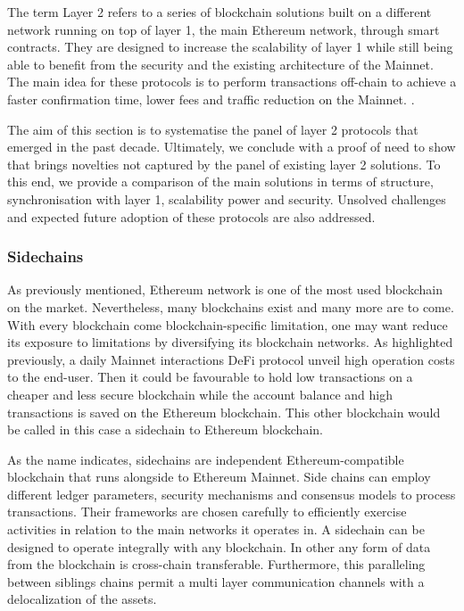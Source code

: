 The term Layer 2 refers to a series of blockchain solutions built on a different network running on top of layer 1, the main Ethereum network, through smart contracts. They are designed to increase the scalability of layer 1 while still being able to benefit from the security and the existing architecture of the Mainnet. The main idea for these protocols is to perform transactions off-chain to achieve a faster confirmation time, lower fees and traffic reduction on the Mainnet. \cite{gudgeon_sok_2020, noauthor_layer_nodate}.

The aim of this section is to systematise the panel of layer 2 protocols that emerged in the past decade. Ultimately, we conclude with a proof of need to show that {\projectName} brings novelties not captured by the panel of existing layer 2 solutions. To this end, we provide a comparison of the main solutions in terms of structure, synchronisation with layer 1, scalability power and security. Unsolved challenges and expected future adoption of these protocols are also addressed.  


\subsubsection{Sidechains}

As previously mentioned, Ethereum network is one of the most used blockchain on the market. Nevertheless, many blockchains exist and many more are to come. With every blockchain come blockchain-specific limitation, one may want reduce its exposure to limitations by diversifying its blockchain networks. As highlighted previously, a daily Mainnet interactions DeFi protocol unveil high operation costs to the end-user. Then it could be favourable to hold low transactions on a cheaper and less secure blockchain while the account balance and high transactions is saved on the Ethereum blockchain. This other blockchain would be called in this case a sidechain to Ethereum blockchain.

As the name indicates, sidechains are independent Ethereum-compatible blockchain that runs alongside to Ethereum Mainnet. Side chains can employ different ledger parameters, security mechanisms and consensus models to process transactions. Their frameworks are chosen carefully to efficiently exercise activities in relation to the main networks it operates in. A sidechain can be designed to operate integrally with any blockchain. In other any form of data from the blockchain is cross-chain transferable. Furthermore, this paralleling between siblings chains permit a multi layer communication channels with a delocalization of the assets.

